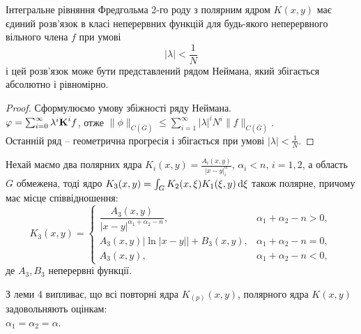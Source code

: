\begin{theorem}
	Інтегральне рівняння Фредгольма 2-го роду з полярним ядром $K(x, y)$ має єдиний розв’язок в класі неперервних функцій для будь-якого неперервного вільного члена $f$ при умові
	\begin{equation}
		\label{eq:1.23}
		|\lambda| < \dfrac{1}{N}
	\end{equation}
	і цей розв’язок може бути представлений рядом Неймана, який збігається абсолютно і рівномірно.
\end{theorem}
\begin{proof}
	Сформулюємо умову збіжності ряду Неймана. \\

	$\phi = \sum_{i = 0}^\infty \lambda^i \bf{K}^i f$, отже $\|\phi\|_{C(\bar G)} \le \sum_{i = 1}^\infty |\lambda|^i N^i \|f\|_{C(\bar G)}$. \\

	Останній ряд – геометрична прогресія і збігається при умові $|\lambda| < \frac{1}{N}$.
\end{proof}

\begin{lemma}
	Нехай маємо два полярних ядра $K_i(x, y) = \frac{A_i(x, y)}{|x - y|^\alpha_i}$, $\alpha_i < n$, $i = 1, 2$, а область $G$ обмежена, тоді ядро $K_3(x, y) = \int_G K_2(x, \xi) K_1(\xi, y) \diff \xi$ також полярне, причому має місце співвідношення:
	\begin{equation}
		\label{eq:1.24}
		K_3(x, y) = \begin{cases}
			\dfrac{A_3(x, y)}{|x - y|^{\alpha_1 + \alpha_2 - n}}, & \alpha_1 + \alpha_2 - n > 0, \\
			A_3(x, y) |\ln|x - y|| + B_3(x, y), & \alpha_1 + \alpha_2 - n = 0, \\
			A_3(x, y), & \alpha_1 + \alpha_2 - n < 0,
		\end{cases}
	\end{equation}
	де $A_3, B_3$ неперервні функції.
\end{lemma}

З леми 4 випливає, що всі повторні ядра $K_{(p)}(x, y)$, полярного ядра $K(x, y)$ задовольняють оцінкам: \\

$\alpha_1 = \alpha_2 = \alpha$.

